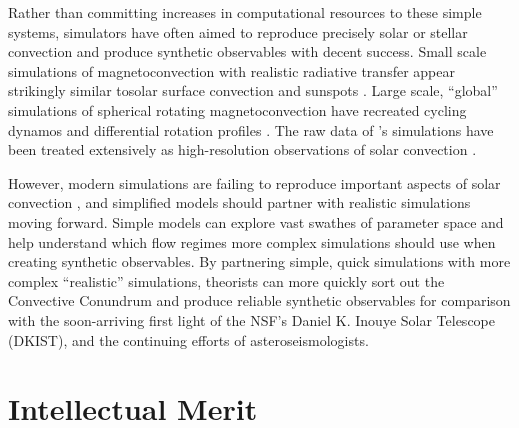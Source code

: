 \documentclass[11pt, preprint]{aastex}
\begin{document}
Rather than committing increases in computational resources to these simple systems, simulators have often aimed to reproduce precisely solar or stellar convection and produce synthetic observables with decent success.
Small scale simulations of magnetoconvection with realistic radiative transfer appear strikingly similar tosolar surface convection and sunspots \citep{stein&nordlund1998, rempel&all2009, stein&nordlund2012, rempel2014}.
Large scale, ``global'' simulations of spherical rotating magnetoconvection have recreated cycling dynamos and differential rotation profiles \citep{brown&all2010, brown&all2011, guerrero&all2016, hotta&all2016, brun&all2017, strugarek&all2018}.
The raw data of \citet{rempel2014}'s simulations have been treated extensively as high-resolution observations of solar convection \citep[see e.g.,][and others]{vankooten&cranmer2017, shchukina&trujillo2019}.

However, modern simulations are failing to reproduce important aspects of solar convection \citep{hanasoge&all2015}, and simplified models should partner with realistic simulations moving forward.
Simple models can explore vast swathes of parameter space and help understand which flow regimes more complex simulations should use when creating synthetic observables.
By partnering simple, quick simulations with more complex ``realistic'' simulations, theorists can more quickly sort out the Convective Conundrum and produce reliable synthetic observables for comparison with the soon-arriving first light of the NSF's Daniel K. Inouye Solar Telescope (DKIST), and the continuing efforts of asteroseismologists.


\section{Intellectual Merit}

\label{sct:intellectual_merit}
\end{document}
